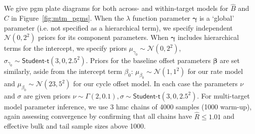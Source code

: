 \documentclass[../thesis.tex]{subfiles}
\begin{document}
We give \gls{pgm} plate diagrams for both across- and within-target models for $\hat{B}$ and $\hat{C}$ in Figure~\ref{fig:mtm_pgms}. When the $\lambda$ function parameter $\bm{\gamma}$ is a `global' parameter (i.e. not specified as a hierarchical term), we specify independent $\mathcal{N}(0,2^2)$ priors for its component parameters. When $\bm{\gamma}$ includes hierarchical terms for the intercept, we specify priors $\mu_{\gamma_{0}} \sim \mathcal{N}(0, 2^2)$, $\sigma_{\gamma_{0}} \sim \textsf{Student-t}(3, 0, 2.5^2)$. Priors for the baseline offset parameters $\bm{\beta}$ are set similarly, aside from the intercept term $\beta_0$: $\mu_{\beta_0} \sim \mathcal{N}(1, 1^2)$ for our rate model and $\mu_{\beta_0} \sim \mathcal{N}(23, 5^2)$ for our cycle offset model. In each case the parameters $\nu$ and $\sigma$ are given priors $\nu \sim \Gamma (2, 0.1), \sigma \sim \textsf{Student-t}(3, 0, 2.5^2)$.
For multi-target model parameter inference, we use 3 \gls{hmc} chains of 4000 samples (1000 warm-up), again assessing convergence by confirming that all chains have $\hat{R} \leq 1.01$ and effective bulk and tail sample sizes above 1000.
\end{document}
